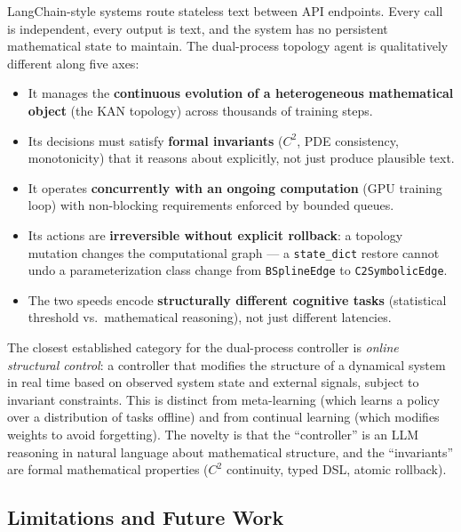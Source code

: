 \documentclass[11pt,a4paper]{article}
\begin{document}
LangChain-style systems route stateless text between API endpoints. Every call is
independent, every output is text, and the system has no persistent mathematical state
to maintain. The dual-process topology agent is qualitatively different along five axes:

\begin{itemize}[nosep]
  \item It manages the \textbf{continuous evolution of a heterogeneous mathematical
  object} (the KAN topology) across thousands of training steps.

  \item Its decisions must satisfy \textbf{formal invariants} ($C^2$, PDE consistency,
  monotonicity) that it reasons about explicitly, not just produce plausible text.

  \item It operates \textbf{concurrently with an ongoing computation} (GPU training
  loop) with non-blocking requirements enforced by bounded queues.

  \item Its actions are \textbf{irreversible without explicit rollback}: a topology
  mutation changes the computational graph --- a \texttt{state\_dict} restore cannot
  undo a parameterization class change from \texttt{BSplineEdge} to
  \texttt{C2SymbolicEdge}.

  \item The two speeds encode \textbf{structurally different cognitive tasks}
  (statistical threshold vs.\ mathematical reasoning), not just different latencies.
\end{itemize}

The closest established category for the dual-process controller is \emph{online
structural control}: a controller that modifies the structure of a dynamical system
in real time based on observed system state and external signals, subject to invariant
constraints. This is distinct from meta-learning (which learns a policy over a
distribution of tasks offline) and from continual learning
\citep{kirkpatrick2017overcoming} (which modifies weights to avoid forgetting). The
novelty is that the ``controller'' is an LLM reasoning in natural language about
mathematical structure, and the ``invariants'' are formal mathematical properties
($C^2$ continuity, typed DSL, atomic rollback).

\subsection{Limitations and Future Work}
\label{sec:limfuture}
\end{document}

